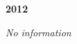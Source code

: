 \begin{center}
  \Huge
  \textbf{2012}
\end{center}

\begin{center}
  \textit{No information}
\end{center}

\vspace{50mm}

\pagebreak
